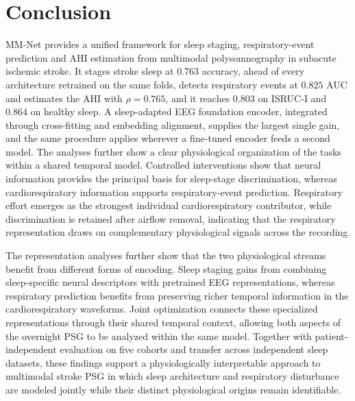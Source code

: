 \documentclass{ieeeaccess}
\newcommand{\mmAcc}{0.763}
\newcommand{\mmAuc}{0.825}
\newcommand{\mmRho}{0.765}
\begin{document}
\section{Conclusion}

MM-Net provides a unified framework for sleep staging, respiratory-event
prediction and AHI estimation from multimodal polysomnography in subacute ischemic stroke.
It stages stroke sleep at $\mmAcc$ accuracy, ahead of every architecture retrained on the same
folds, detects respiratory events at $\mmAuc$ AUC and estimates the AHI with $\rho=\mmRho$, and it
reaches $0.803$ on ISRUC-I and $0.864$ on healthy sleep. A sleep-adapted EEG foundation encoder,
integrated through cross-fitting and embedding alignment, supplies the largest single gain, and
the same procedure applies wherever a fine-tuned encoder feeds a second model. The analyses
further show a clear physiological organization of the tasks within a shared temporal model. Controlled interventions show that neural information
provides the principal basis for sleep-stage discrimination, whereas
cardiorespiratory information supports respiratory-event prediction.
Respiratory effort emerges as the strongest individual cardiorespiratory
contributor, while discrimination is retained after airflow removal, indicating
that the respiratory representation draws on complementary physiological
signals across the recording.

The representation analyses further show that the two physiological streams
benefit from different forms of encoding. Sleep staging gains from combining
sleep-specific neural descriptors with pretrained EEG representations, whereas
respiratory prediction benefits from preserving richer temporal information in
the cardiorespiratory waveforms. Joint optimization connects these specialized
representations through their shared temporal context, allowing both aspects of
the overnight PSG to be analyzed within the same model. Together with
patient-independent evaluation on five cohorts and transfer across independent sleep datasets,
these findings support a physiologically interpretable approach to multimodal
stroke PSG in which sleep architecture and respiratory disturbance are modeled
jointly while their distinct physiological origins remain identifiable.


\end{document}
